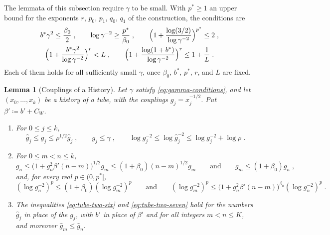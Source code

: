 \documentclass[11pt]{preprint}
\numberwithin{equation}{section}
\newtheorem{lemma}[theorem]{Lemma}
\theoremstyle{definition}
\theoremstyle{remark}
\theoremstyle{plain}
\begin{document}
The lemmata of this subsection require $\gamma$ to be small. With $p^* \geq 1$ an upper bound for the exponents $r$, $p_0$, $p_1$, $q_0$, $q_1$ of the construction, the conditions are
\begin{equation}\label{eq:gamma-conditions}
\begin{gathered}
    b^*\gamma^2 \leq \frac{\beta_0}{2}\;,
    \qquad
    \log\gamma^{-2} \geq \frac{p^*}{\beta_0}\;,
    \qquad
    \Bigl(1 + \frac{\log(3/2)}{\log\gamma^{-2}}\Bigr)^{p^*} \leq 2\;,\\
    \Bigl(1 + \frac{b^*\gamma^2}{\log\gamma^{-2}}\Bigr)^{r} < L\;,
    \qquad
    \Bigl(1 + \frac{\log(1 + b^*)}{\log\gamma^{-2}}\Bigr)^{r} \leq 1 + \frac{1}{L}\;.
\end{gathered}
\end{equation}
Each of them holds for all sufficiently small $\gamma$, once $\beta_0$, $b^*$, $p^*$, $r$, and $L$ are fixed.

\begin{lemma}[Couplings of a History]\label{lem:tube-couplings}
Let $\gamma$ satisfy \eqref{eq:gamma-conditions}, and let $(x_0, \dots, x_k)$ be a history of a tube, with the couplings $g_j = x_j^{-1/2}$. Put $\beta' \coloneqq b' + C_W$.
\begin{enumerate}[label=(\roman*)]
\item For $0 \leq j \leq k$,
\begin{equation}\label{eq:tube-coupling-ratio}
    \hat g_j \leq g_j \leq \rho^{1/2}\hat g_j\;,
    \qquad
    g_j \leq \gamma\;,
    \qquad
    \log g_j^{-2} \leq \log\hat g_j^{-2} \leq \log g_j^{-2} + \log\rho\;.
\end{equation}
\item For $0 \leq m < n \leq k$,
\begin{equation}\label{eq:tube-two-six}
    g_n \leq \bigl(1 + g_n^2\beta'(n - m)\bigr)^{1/2}g_m \leq (1 + \beta_0)(n - m)^{1/2}g_m
    \qquad\text{and}\qquad
    g_m \leq (1 + \beta_0)g_n\;,
\end{equation}
and, for every real $p \in (0, p^*]$,
\begin{equation}\label{eq:tube-two-seven}
    (\log g_n^{-2})^p \leq (1 + \beta_0)(\log g_m^{-2})^p
    \qquad\text{and}\qquad
    (\log g_m^{-2})^p \leq \bigl(1 + g_n^2\beta'(n - m)\bigr)^{\beta_0}(\log g_n^{-2})^p\;.
\end{equation}
\item The inequalities \eqref{eq:tube-two-six} and \eqref{eq:tube-two-seven} hold for the numbers $\hat g_j$ in place of the $g_j$, with $b'$ in place of $\beta'$ and for all integers $m < n \leq K$, and moreover $\hat g_m \leq \hat g_n$.
\end{enumerate}
\end{lemma}
\end{document}
